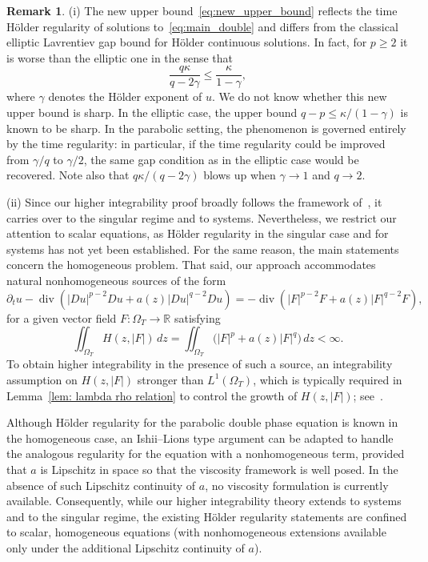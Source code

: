 \documentclass[notitlepage,11pt,reqno]{amsart}
\theoremstyle{definition}
\newtheorem{remark}[theorem]{Remark}
\numberwithin{equation}{section}
\newcommand{\RR}{\mathds{R}}
\begin{document}
\begin{remark}\label{rem:comments}
\textup{(i)} The new upper bound~\eqref{eq:new_upper_bound} reflects the time
H\"older regularity of solutions to~\eqref{eq:main_double} and differs from the
classical elliptic Lavrentiev gap bound for H\"older continuous solutions. In
fact, for $p \ge 2$ it is worse than the elliptic one in the sense that
\[
  \frac{q\kappa}{q - 2\gamma} \le \frac{\kappa}{1 - \gamma},
\]
where $\gamma$ denotes the H\"older exponent of $u$. We do not know whether
this new upper bound is sharp. In the elliptic case, the upper bound
$q-p \le \kappa/(1 - \gamma)$ is known to be sharp. In the parabolic setting,
the phenomenon is governed entirely by the time regularity: in particular, if
the time regularity could be improved from $\gamma/q$ to $\gamma/2$, the same
gap condition as in the elliptic case would be recovered. Note also that
$q\kappa/(q - 2\gamma)$ blows up when $\gamma \to 1$ and $q\to 2$.

\textup{(ii)} Since our higher integrability proof broadly follows the
framework of~\cite{2023_Gradient_Higher_Integrability_for_Degenerate_Parabolic_Double-Phase_Systems, S25}, it carries over to the singular
regime and to systems. Nevertheless, we restrict our attention to scalar
equations, as H\"older regularity in the singular case and for systems has
not yet been established. For the same reason, the main statements concern
the homogeneous problem. That said, our approach accommodates natural
nonhomogeneous sources of the form
\begin{equation*}
  \partial_tu - \operatorname{div}\left(|Du|^{p-2}Du + a(z)|Du|^{q-2}Du\right)
  = -\operatorname{div}\left(|F|^{p-2}F + a(z)|F|^{q-2}F\right),
\end{equation*}
for a given vector field $F : \Omega_T \to \RR$ satisfying
\[
  \iint_{\Omega_T} H(z, |F|)\, dz
  = \iint_{\Omega_T} \bigl(|F|^p + a(z)|F|^q\bigr)\, dz < \infty.
\]
To obtain higher integrability in the presence of such a source, an integrability assumption on $H(z, |F|)$ stronger than $L^1(\Omega_T)$, which is typically required in Lemma~\ref{lem: lambda rho relation} to control the growth of $H(z, |F|)$; see~\cite{CGK2025}.

Although H\"older regularity for the parabolic double phase equation is known
in the homogeneous case, an Ishii--Lions type argument can be adapted to
handle the analogous regularity for the equation with a nonhomogeneous term,
provided that $a$ is Lipschitz in space so that the viscosity framework is well
posed. In the absence of such Lipschitz continuity of $a$, no viscosity
formulation is currently available. Consequently, while our higher
integrability theory extends to systems and to the singular regime, the
existing H\"older regularity statements are confined to scalar, homogeneous
equations (with nonhomogeneous extensions available only under the additional
Lipschitz continuity of $a$).


\end{remark}
\end{document}
